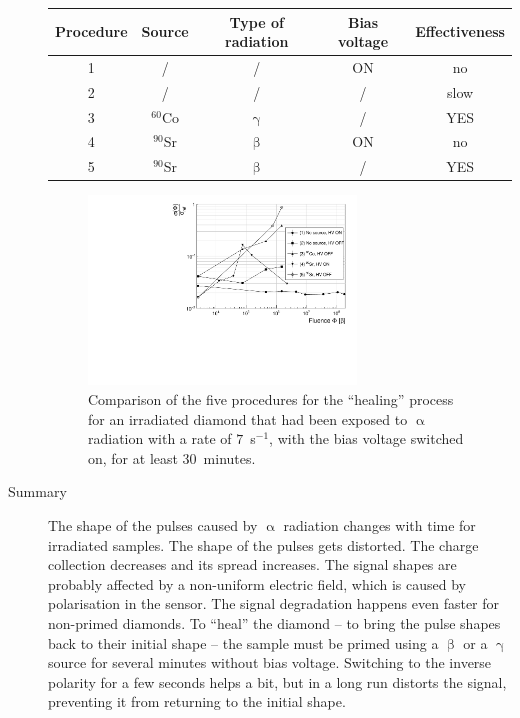 \begin{description}
\begin{footnotesize}
\begin{center}
\begin{tabular}{   c  c  c  c c }
\hline
Procedure & Source & Type of radiation & Bias voltage & Effectiveness \\
\hline
1 & /                   & /                 & ON    & no \\
2 & /                   & /                 & /        & slow \\
3 & $^{60}$Co   & $\upgamma$ &/         & YES \\
4 & $^{90}$Sr    & $\upbeta$      & ON    & no \\
5 & $^{90}$Sr    & $\upbeta$      & /         & YES \\
\hline
\end{tabular}
\label{tab:healing}
\end{center}
\end{footnotesize}

\begin{figure}[!t]
\begin{center}
\includegraphics[width=0.7\textwidth]{03_measurement_results/scripts/plots/plotLifetime/formCorrelation}
\caption{Comparison of the five procedures for the ``healing'' process for an irradiated diamond that had been exposed to $\upalpha$ radiation with a rate of $7$~s$^{-1}$, with the bias voltage switched on, for at least 30~minutes.}
\label{fig:formCorr}
\end{center}
\end{figure}


\item[Summary] The shape of the pulses caused by $\upalpha$ radiation changes with time for irradiated samples. The shape of the pulses gets distorted. The charge collection decreases and its spread increases. The signal shapes are probably affected by a non-uniform electric field, which is caused by polarisation in the sensor. The signal degradation happens even faster for non-primed diamonds. To ``heal'' the diamond -- to bring the pulse shapes back to their initial shape -- the sample must be primed using a $\upbeta$ or a $\upgamma$ source for several minutes without bias voltage. Switching to the inverse polarity for a few seconds helps a bit, but in a long run distorts the signal, preventing it from returning to the initial shape.
\end{description}
